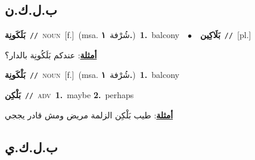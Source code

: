 \documentclass[10pt,a4paper,twoside]{article} %
\begin{document}
\begin{multicols}{2}
\vspace{-3mm}
\subsection*{\color{blue}\foreignlanguage{arabic}{ب.ل.ك.ن}\color{blue}{ (ntws)}} 

{\setlength\topsep{0pt}\textbf{\foreignlanguage{arabic}{بَلَكَونِة}}\ {\color{gray}\texttt{//}\color{black}}\ \textsc{noun}\ [f.]\ \color{gray}(msa. \foreignlanguage{arabic}{شُرْفة}~\foreignlanguage{arabic}{\textbf{١.}})\color{black}\ \textbf{1.}~balcony\ \ $\bullet$\ \ \setlength\topsep{0pt}\textbf{\foreignlanguage{arabic}{بَلَاكِين}}\ {\color{gray}\texttt{//}\color{black}}\ [pl.]\  \begin{flushright}\color{gray}\foreignlanguage{arabic}{\textbf{\underline{\foreignlanguage{arabic}{أمثلة}}}: عندكم بَلَكُونِة بالدار؟}\end{flushright}\color{black}} \vspace{2mm}

{\setlength\topsep{0pt}\textbf{\foreignlanguage{arabic}{بَلْكَونِة}}\ {\color{gray}\texttt{//}\color{black}}\ \textsc{noun}\ [f.]\ \color{gray}(msa. \foreignlanguage{arabic}{شُرْفة}~\foreignlanguage{arabic}{\textbf{١.}})\color{black}\ \textbf{1.}~balcony\ } \vspace{2mm}

{\setlength\topsep{0pt}\textbf{\foreignlanguage{arabic}{بَلْكِن}}\ {\color{gray}\texttt{//}\color{black}}\ \textsc{adv}\ \textbf{1.}~maybe  \textbf{2.}~perhaps\  \begin{flushright}\color{gray}\foreignlanguage{arabic}{\textbf{\underline{\foreignlanguage{arabic}{أمثلة}}}: طيب بَلْكِن الزلمة مريض ومش قادر يججي}\end{flushright}\color{black}} \vspace{2mm}

\vspace{-3mm}
\subsection*{\color{blue}\foreignlanguage{arabic}{ب.ل.ك.ي}\color{blue}{ (ntws)}} 


\end{multicols}
\end{document}
